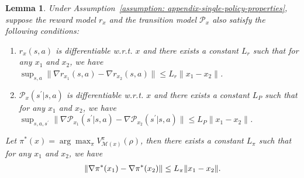 \documentclass{article}
\theoremstyle{plain}
\newtheorem{lemma}{Lemma}
\theoremstyle{definition}
\theoremstyle{remark}
\def\cM{\mathcal M}
\def\cP{\mathcal P}
\begin{document}
\begin{lemma}
    \label{lemma: lipschitz-of-nable-pi-star-of-x}
    Under Assumption~\ref{assumption: appendix-single-policy-properties}, suppose the reward model $r_x$ and the transition model $\cP_x$ also satisfy the following conditions:
    \begin{enumerate}
        \vspace{-2mm}
        \item $r_x(s,a)$ is differentiable w.r.t. $x$ and there exists a constant $L_r$ such that for any $x_1$ and $x_2$, we have $\sup_{s,a} \| \nabla r_{x_1}(s,a) - \nabla r_{x_2}(s,a) \| \leq L_r \|x_1 - x_2\|$.
        \item $\cP_x(s^\prime|s,a)$ is differentiable w.r.t. $x$ and there exists a constant $L_P$ such that for any $x_1$ and $x_2$, we have $\sup_{s,a, s^\prime} \| \nabla \cP_{x_1}(s^\prime|s,a) - \nabla \cP_{x_2}(s^\prime|s,a) \| \leq L_P \|x_1 - x_2\|$.
    \end{enumerate}
    Let $\pi^*(x) = \arg\max_\pi V^\pi_{\cM(x)}(\rho)$, then there exists a constant $L_\pi$ such that for any $x_1$ and $x_2$, we have
    \begin{align}
        \|\nabla \pi^*(x_1)  - \nabla \pi^*(x_2)\| \leq L_\pi \| x_1 - x_2 \|. \notag
    \end{align}
\end{lemma}
\end{document}
